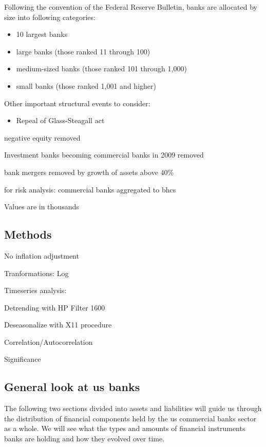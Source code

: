 \documentclass[12pt, a4paper]{article} %
\begin{document}
Following the convention of the Federal Reserve Bulletin, banks are allocated by size into following categories:
\begin{itemize}
 \item 10 largest banks
 \item large banks (those ranked
  11 through 100)
 \item medium-sized banks (those ranked 101 through
 1,000)
 \item small banks (those ranked 1,001 and higher)
 \end{itemize} 

Other important structural events to consider:
\begin{itemize}
\item Repeal of Glass-Steagall act 
\end{itemize}

negative equity removed

Investment banks becoming commercial banks in 2009 removed

bank mergers removed by growth of assets above $40\%$

for risk analysis: commercial banks aggregated to bhcs

Values are in thousands

\subsection{Methods}


No inflation adjustment

Tranformations: Log

Timeseries analysis:

Detrending with HP Filter 1600

Deseasonalize with X11 procedure

Correlation/Autocorrelation

Significance



\subsection{General look at us banks}

The following two sections divided into assets and liabilities will guide us through the distribution of financial components held by the us commercial banks sector as a whole. We will see what the types and amounts of financial instruments banks are holding and how they evolved over time. 
\end{document}
